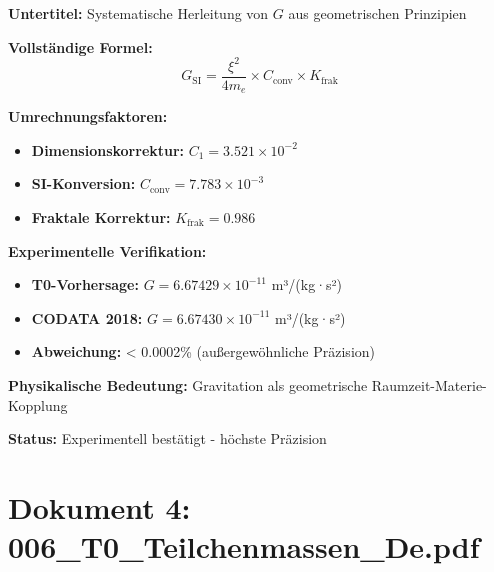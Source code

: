 	\begin{documentbox}
		\textbf{Untertitel:} Systematische Herleitung von $G$ aus geometrischen Prinzipien
		
		\textbf{Vollständige Formel:}
		\begin{equation}
			\boxed{G_{\text{SI}} = \frac{\xi^2}{4 m_e} \times C_{\text{conv}} \times K_{\text{frak}}}
		\end{equation}
		
		\textbf{Umrechnungsfaktoren:}
		\begin{itemize}
			\item \textbf{Dimensionskorrektur:} $C_1 = 3.521 \times 10^{-2}$ 
			\item \textbf{SI-Konversion:} $C_{\text{conv}} = 7.783 \times 10^{-3}$
			\item \textbf{Fraktale Korrektur:} $K_{\text{frak}} = 0.986$
		\end{itemize}
		
		\textbf{Experimentelle Verifikation:}
		\begin{itemize}
			\item \textbf{T0-Vorhersage:} $G = 6.67429 \times 10^{-11}$ m³/(kg·s²)
			\item \textbf{CODATA 2018:} $G = 6.67430 \times 10^{-11}$ m³/(kg·s²)
			\item \textbf{Abweichung:} < 0.0002\% (außergewöhnliche Präzision)
		\end{itemize}
		
		\textbf{Physikalische Bedeutung:} Gravitation als geometrische Raumzeit-Materie-Kopplung
		
		\textbf{Status:} Experimentell bestätigt - höchste Präzision
	\end{documentbox}
	
	\section{Dokument 4: 006\_T0\_Teilchenmassen\_De.pdf}
	
